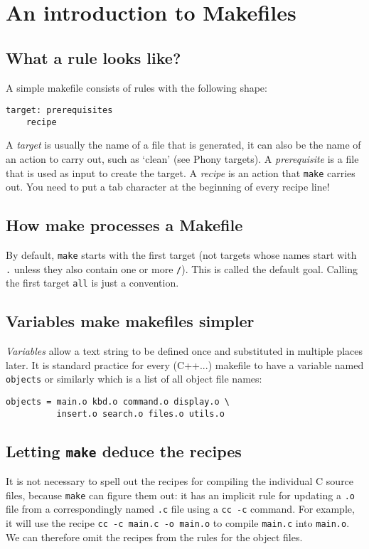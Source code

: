 %

\section{An introduction to Makefiles}
\subsection{What a rule looks like?}
A simple makefile consists of rules with the following shape:
\begin{verbatim}
target: prerequisites
    recipe
\end{verbatim}

A \emph{target} is usually the name of a file that is generated, it can also be the name of an action to carry out, such as ‘clean’ (see Phony targets).
A \emph{prerequisite} is a file that is used as input to create the target.
A \emph{recipe} is an action that \texttt{make} carries out.
You need to put a tab character at the beginning of every recipe line! 

\subsection{How make processes a Makefile}
By default, \texttt{make} starts with the first target (not targets whose names start with \texttt{.} unless they also contain one or more \texttt{/}).
This is called the default goal.
Calling the first target \texttt{all} is just a convention. 

\subsection{Variables make makefiles simpler}
\emph{Variables} allow a text string to be defined once and substituted in multiple places later.
It is standard practice for every (C++...) makefile to have a variable named \texttt{objects} or similarly which is a list of all object file names:
\begin{verbatim}
objects = main.o kbd.o command.o display.o \
          insert.o search.o files.o utils.o
\end{verbatim}

\subsection{Letting \texttt{make} deduce the recipes}
It is not necessary to spell out the recipes for compiling the individual C source files, because \texttt{make} can figure them out:
it has an implicit rule for updating a \texttt{.o} file from a correspondingly named \texttt{.c} file using a \texttt{cc -c} command.
For example, it will use the recipe \texttt{cc -c main.c -o main.o} to compile \texttt{main.c} into \texttt{main.o}.
We can therefore omit the recipes from the rules for the object files. 

